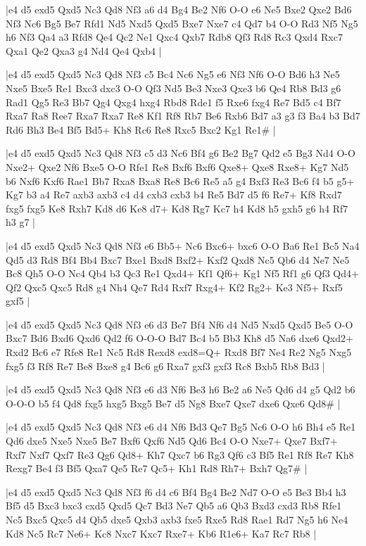 \whitename{}
\blackname{}
\makegametitle
|e4 d5 exd5 Qxd5 Nc3 Qd8 Nf3 a6 d4 Bg4 Be2 Nf6 O-O e6 Ne5 Bxe2 Qxe2 Bd6 Nf3 Nc6 Bg5 Be7 Rfd1 Nd5 Nxd5 Qxd5 Bxe7 Nxe7 c4 Qd7 b4 O-O Rd3 Nf5 Ng5 h6 Nf3 Qa4 a3 Rfd8 Qe4 Qc2 Ne1 Qxc4 Qxb7 Rdb8 Qf3 Rd8 Rc3 Qxd4 Rxc7 Qxa1 Qe2 Qxa3 g4 Nd4 Qe4 Qxb4  |

\whitename{}
\blackname{}
\makegametitle
|e4 d5 exd5 Qxd5 Nc3 Qd8 Nf3 c5 Bc4 Nc6 Ng5 e6 Nf3 Nf6 O-O Bd6 h3 Ne5 Nxe5 Bxe5 Re1 Bxc3 dxc3 O-O Qf3 Nd5 Be3 Nxe3 Qxe3 b6 Qe4 Rb8 Bd3 g6 Rad1 Qg5 Re3 Bb7 Qg4 Qxg4 hxg4 Rbd8 Rde1 f5 Rxe6 fxg4 Re7 Bd5 c4 Bf7 Rxa7 Ra8 Ree7 Rxa7 Rxa7 Re8 Kf1 Rf8 Rb7 Be6 Rxb6 Bd7 a3 g3 f3 Ba4 b3 Bd7 Rd6 Bh3 Be4 Bf5 Bd5+ Kh8 Rc6 Re8 Rxc5 Bxc2 Kg1 Re1\#  |

\whitename{}
\blackname{}
\makegametitle
|e4 d5 exd5 Qxd5 Nc3 Qd8 Nf3 c5 d3 Nc6 Bf4 g6 Be2 Bg7 Qd2 e5 Bg3 Nd4 O-O Nxe2+ Qxe2 Nf6 Bxe5 O-O Rfe1 Re8 Bxf6 Bxf6 Qxe8+ Qxe8 Rxe8+ Kg7 Nd5 b6 Nxf6 Kxf6 Rae1 Bb7 Rxa8 Bxa8 Re8 Bc6 Re5 a5 g4 Bxf3 Re3 Bc6 f4 b5 g5+ Kg7 b3 a4 Re7 axb3 axb3 c4 d4 cxb3 cxb3 b4 Re5 Bd7 d5 f6 Re7+ Kf8 Rxd7 fxg5 fxg5 Ke8 Rxh7 Kd8 d6 Ke8 d7+ Kd8 Rg7 Kc7 h4 Kd8 h5 gxh5 g6 h4 Rf7 h3 g7  |

\whitename{}
\blackname{}
\makegametitle
|e4 d5 exd5 Qxd5 Nc3 Qd8 Nf3 e6 Bb5+ Nc6 Bxc6+ bxc6 O-O Ba6 Re1 Bc5 Na4 Qd5 d3 Rd8 Bf4 Bb4 Bxc7 Bxe1 Bxd8 Bxf2+ Kxf2 Qxd8 Nc5 Qb6 d4 Ne7 Ne5 Bc8 Qh5 O-O Nc4 Qb4 b3 Qc3 Re1 Qxd4+ Kf1 Qf6+ Kg1 Nf5 Rf1 g6 Qf3 Qd4+ Qf2 Qxc5 Qxc5 Rd8 g4 Nh4 Qe7 Rd4 Rxf7 Rxg4+ Kf2 Rg2+ Ke3 Nf5+ Rxf5 gxf5  |

\whitename{}
\blackname{}
\makegametitle
|e4 d5 exd5 Qxd5 Nc3 Qd8 Nf3 e6 d3 Be7 Bf4 Nf6 d4 Nd5 Nxd5 Qxd5 Be5 O-O Bxc7 Bd6 Bxd6 Qxd6 Qd2 f6 O-O-O Bd7 Bc4 b5 Bb3 Kh8 d5 Na6 dxe6 Qxd2+ Rxd2 Bc6 e7 Rfe8 Re1 Nc5 Rd8 Rexd8 exd8=Q+ Rxd8 Bf7 Ne4 Re2 Ng5 Nxg5 fxg5 f3 Rf8 Re7 Be8 Bxe8 g4 Bc6 g6 Rxa7 gxf3 gxf3 Rc8 Bxb5 Rb8 Bd3  |

\whitename{}
\blackname{}
\makegametitle
|e4 d5 exd5 Qxd5 Nc3 Qd8 Nf3 e6 d3 Nf6 Be3 h6 Be2 a6 Ne5 Qd6 d4 g5 Qd2 b6 O-O-O b5 f4 Qd8 fxg5 hxg5 Bxg5 Be7 d5 Ng8 Bxe7 Qxe7 dxe6 Qxe6 Qd8\#  |

\whitename{}
\blackname{}
\makegametitle
|e4 d5 exd5 Qxd5 Nc3 Qd8 Nf3 e6 d4 Nf6 Bd3 Qe7 Bg5 Nc6 O-O h6 Bh4 e5 Re1 Qd6 dxe5 Nxe5 Nxe5 Be7 Bxf6 Qxf6 Nd5 Qd6 Bc4 O-O Nxe7+ Qxe7 Bxf7+ Rxf7 Nxf7 Qxf7 Re3 Qg6 Qd8+ Kh7 Qxc7 b6 Rg3 Qf6 c3 Bf5 Re1 Rf8 Re7 Kh8 Rexg7 Be4 f3 Bf5 Qxa7 Qe5 Re7 Qc5+ Kh1 Rd8 Rh7+ Bxh7 Qg7\#  |

\whitename{}
\blackname{}
\makegametitle
|e4 d5 exd5 Qxd5 Nc3 Qd8 Nf3 f6 d4 c6 Bf4 Bg4 Be2 Nd7 O-O e5 Be3 Bb4 h3 Bf5 d5 Bxc3 bxc3 cxd5 Qxd5 Qc7 Bd3 Ne7 Qb5 a6 Qb3 Bxd3 cxd3 Rb8 Rfe1 Nc5 Bxc5 Qxc5 d4 Qb5 dxe5 Qxb3 axb3 fxe5 Rxe5 Rd8 Rae1 Rd7 Ng5 h6 Ne4 Kd8 Nc5 Rc7 Ne6+ Kc8 Nxc7 Kxc7 Rxe7+ Kb6 R1e6+ Ka7 Rc7 Rb8  |

